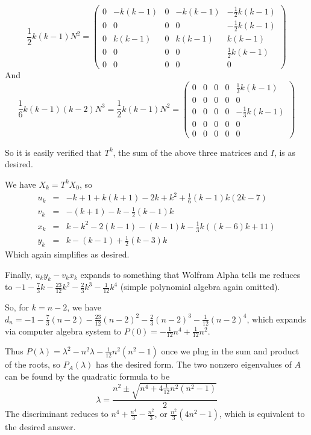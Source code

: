 \documentclass{article}
\begin{document}
\[
\frac{1}{2}k(k-1)N^2 = \left( 
\begin{array}{ccccc}
  0 & -k(k-1) & 0 & -k(k-1) & -\frac{1}{2}k(k-1) \\
  0 &   0 & 0 &  0 & -\frac{1}{2}k(k-1) \\
0 &  k(k-1) & 0 & k(k-1) & k(k-1) \\
0 &   0 & 0 &  0 &  \frac{1}{2}k(k-1)  \\
0 & 0 & 0 & 0 & 0
\end{array}
\right)
\]
And 
\[
\frac{1}{6}k(k-1)(k-2)N^3 = 
\frac{1}{2}k(k-1)N^2 = \left( 
\begin{array}{ccccc}
0 & 0 & 0 & 0 & \frac{1}{3}k(k-1) \\
0 & 0 & 0 & 0 & 0 \\
0 & 0 & 0 & 0 & -\frac{1}{3}k(k-1)  \\
0 & 0 & 0 & 0 & 0  \\
0 & 0 & 0 & 0 & 0
\end{array}
\right)
\]

So it is easily verified that 
$T^k$, the sum of the above three matrices and $I$, is as desired.

We have $X_k = T^k X_0$, so 
\begin{eqnarray*}
  u_k &=& -k+1 +k(k+1) - 2k + k^2 + \frac{1}{6}(k-1)k(2k-7)\\
  v_k &=&  -(k+1) -k - \frac{1}{2}(k-1)k\\
  x_k &=& k - k^2 -2(k-1) - (k-1)k - \frac{1}{3}k(( k-6)k + 11)\\
  y_k &=&  k - (k-1) + \frac{1}{2}(k-3)k
\end{eqnarray*}
Which again simplifies as desired.

Finally, $u_k y_k - v_k x_k$ expands to something that Wolfram Alpha tells me reduces to $-1 - \frac{7}{3}k - \frac{23}{12}k^2 - \frac{2}{3}k^3 - \frac{1}{12}k^4$ (simple polynomial algebra again omitted).

So, for $k = n -2$, we have $d_n = -1 - \frac{7}{3}(n-2) - \frac{23}{12}(n-2)^2 - \frac{2}{3}(n-2)^3 - \frac{1}{12}(n-2)^4$, which expands via computer algebra system to $P(0) = -\frac{1}{12}n^4 + \frac{1}{12} n^2$.

Thus $P(\lambda) = \lambda^2 - n^2\lambda - \frac{1}{12}n^2(n^2-1)$ once we plug in the sum and product of the roots, so $P_A(\lambda)$ has the desired form.
The two nonzero eigenvalues of $A$ can be found by the quadratic formula to be
\[\lambda =  \frac{n^2 \pm \sqrt{n^4 + 4 \frac{1}{12} n^2(n^2-1)}}{2}\]
The discriminant reduces to $n^4 + \frac{n^4}{3} - \frac{n^2}{3}$, or 
$\frac{n^2}{3}(4n^2 - 1)$, which is equivalent to the desired answer.
\end{document}
